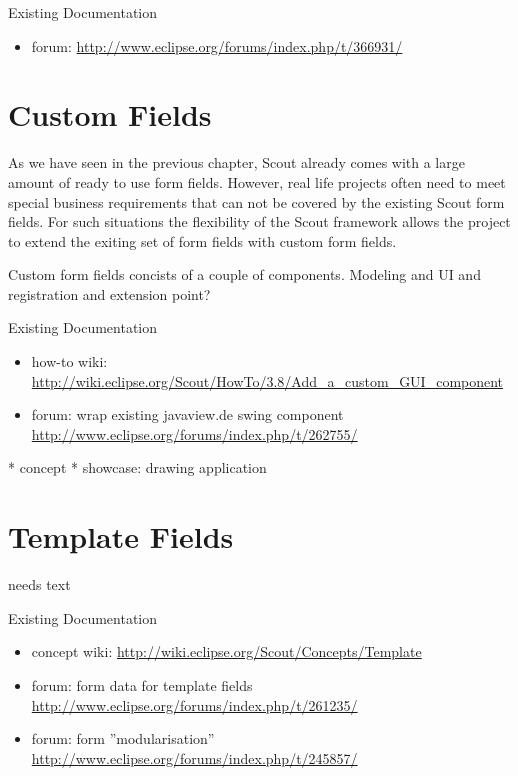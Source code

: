 \documentclass[a4paper,10pt,twoside]{book}
\begin{document}
\noindent Existing Documentation
\begin{itemize}
  \item forum: \url{http://www.eclipse.org/forums/index.php/t/366931/}
\end{itemize}

\chapter{Custom Fields}

As we have seen in the previous chapter, Scout already comes with a large amount of ready to use form fields. 
However, real life projects often need to meet special business requirements that can not be covered by the existing Scout form fields. 
For such situations the flexibility of the Scout framework allows the project to extend the exiting set of form fields with custom form fields. 

Custom form fields concists of a couple of components. Modeling and UI and registration and extension point?

\noindent Existing Documentation
\begin{itemize}
  \item how-to wiki: \url{http://wiki.eclipse.org/Scout/HowTo/3.8/Add_a_custom_GUI_component}
  \item forum: wrap existing javaview.de swing component \url{http://www.eclipse.org/forums/index.php/t/262755/}
\end{itemize}

  * concept
  * showcase: drawing application

\chapter{Template Fields}
needs text

\noindent Existing Documentation
\begin{itemize}
  \item concept wiki: \url{http://wiki.eclipse.org/Scout/Concepts/Template}
  \item forum: form data for template fields \url{http://www.eclipse.org/forums/index.php/t/261235/}
  \item forum: form ''modularisation'' \url{http://www.eclipse.org/forums/index.php/t/245857/}
\end{itemize}
\end{document}
